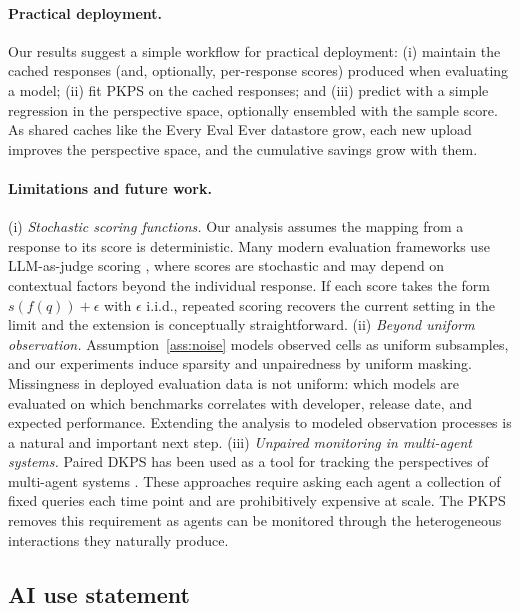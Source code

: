 \documentclass{article}
\theoremstyle{definition}
\theoremstyle{plain}
\newcommand{\PKPS}{PKPS\xspace}
\begin{document}
\paragraph{Practical deployment.}
Our results suggest a simple workflow for practical deployment: (i) maintain the
cached responses (and, optionally, per-response scores) produced when
evaluating a model; (ii) fit \PKPS on the cached responses; and (iii) predict with a simple
regression in the perspective space, optionally ensembled with the sample score.
As shared caches like the Every Eval Ever datastore grow, each new upload
improves the perspective space, and the cumulative savings grow with them.

\paragraph{Limitations and future work.}
(i) \textit{Stochastic scoring functions.}
Our analysis assumes the mapping from a response to its score is deterministic.
Many modern evaluation frameworks use LLM-as-judge scoring \citep{zheng2023judging},
where scores are stochastic and may depend on contextual factors beyond the
individual response.
If each score takes the form $s(f(q))+\epsilon$ with $\epsilon$ i.i.d., repeated
scoring recovers the current setting in the limit and the extension is conceptually
straightforward.
(ii) \textit{Beyond uniform observation.}
Assumption~\ref{ass:noise} models observed cells as uniform subsamples, and our
experiments induce sparsity and unpairedness by uniform masking.
Missingness in deployed evaluation data is not uniform: which models are evaluated
on which benchmarks correlates with developer, release date, and expected
performance.
Extending the analysis to modeled observation processes is a natural and important next step.
(iii) \textit{Unpaired monitoring in multi-agent systems.}
Paired DKPS has been used as a tool for tracking the perspectives of multi-agent
systems \citep{helm2024tracking}.
These approaches require asking each agent a collection of fixed queries each time
point and are prohibitively expensive at scale.
The \PKPS removes this requirement as agents can be monitored through the
heterogeneous interactions they naturally produce.

\clearpage

\subsection*{AI use statement}
\end{document}
